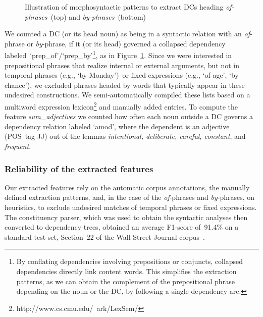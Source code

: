 \documentclass[output=paper]{langsci/langscibook}
\begin{document}
\begin{figure}[h!tb]
   	\caption{Illustration of morphosyntactic patterns to extract DCs heading \textit{of-phrases}~(top) and \textit{by-phrases}~(bottom)}
	\label{fig:patterns-compound-phrases}
\end{figure}

We counted a DC (or its head noun) as being in a syntactic relation with an \textit{of}-phrase or \textit{by}-phrase,  if it (or its head) governed a collapsed dependency labeled~\lq prep\_of\rq/\lq prep\_by\rq\footnote{By conflating dependencies involving prepositions or conjuncts, collapsed dependencies directly link content words.
This simplifies the extraction patterns, as we can obtain the complement of the prepositional phrase depending on the noun or the DC, by following a single dependency arc.}, as in Figure~\ref{fig:patterns-compound-phrases}.
Since we were  interested in prepositional phrases that realize internal or external arguments, but not in 
temporal phrases (e.g., \lq by Monday\rq)~or fixed expressions (e.g., \lq of age\rq, \lq by chance\rq), we excluded phrases headed by words that typically appear in these undesired constructions. We semi-automatically compiled these lists based on a multiword expression lexicon\footnote{http://www.cs.cmu.edu/~ark/LexSem/} and manually added entries. To compute the feature \textit{sum\_adjectives} we counted how often each noun outside a DC governs a dependency relation labeled \lq amod\rq, where the dependent is an adjective (POS~tag JJ) out of the lemmas \textit{intentional, deliberate, careful, constant}, and \textit{frequent}.



\subsubsection{Reliability of the extracted features}
Our extracted features rely on the automatic corpus annotations, the manually defined extraction patterns, and, in the case of the \textit{of}-phrases and \textit{by}-phrases, on heuristics, to exclude undesired matches of temporal phrases or fixed expressions. 
The constituency parser, which was used to obtain the syntactic analyses then converted to dependency trees, obtained an average F1-score of~91.4\% on a standard test set, Section~22 of the Wall Street Journal corpus~\citep{Huang:10}.
\end{document}
